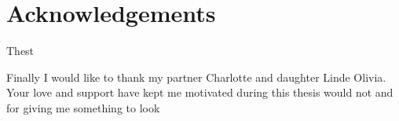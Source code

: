\section*{Acknowledgements}
Thest

Finally I would like to thank my partner Charlotte and daughter Linde Olivia. Your love and support have kept me motivated during  this thesis would not and for giving me something to look
